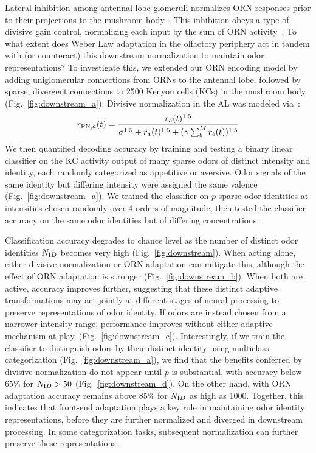 Lateral inhibition among antennal lobe glomeruli normalizes ORN responses prior to their projections to the mushroom body~\cite{lateral_inh, lateral_inh_asahina}. This inhibition obeys a type of divisive gain control, normalizing each input by the sum of ORN activity~\cite{divisive_normalization}. To what extent does Weber Law adaptation in the olfactory periphery act in tandem with (or counteract) this downstream normalization to maintain odor representations? To investigate this, we extended our ORN encoding model by adding uniglomerular connections from ORNs to the antennal lobe, followed by sparse, divergent connections to 2500 Kenyon cells (KCs) in the mushroom body~\cite{memory_review, litwinkumar, abbott_axel} (Fig.~\ref{fig:downstream_a}). Divisive normalization in the AL was modeled via~\cite{divisive_normalization}:
\begin{align}
r_{\textup{PN}, a}(t) = \frac{r_a(t)^{1.5}}{\sigma^{1.5} + r_a(t)^{1.5} + (\gamma\sum_b^Mr_b(t))^{1.5}}
\end{align}
We then quantified decoding accuracy by training and testing a binary linear classifier on the KC activity output of  many sparse odors of distinct intensity and identity,  each randomly categorized as appetitive or aversive. Odor signals of the same identity but differing intensity were assigned the same valence (Fig.~\ref{fig:downstream_a}). We trained the classifier on $p$ sparse odor identities at intensities chosen randomly over 4 orders of magnitude, then tested the classifier accuracy on the same odor identities but of differing concentrations. 

Classification accuracy degrades to chance level as the number of distinct odor identities $N_{\text ID}$ becomes very high (Fig.~\ref{fig:downstream}). When acting alone, either divisive normalization or ORN adaptation can mitigate this, although the effect of ORN adaptation is stronger (Fig.~\ref{fig:downstream_b}). When both are active, accuracy improves further, suggesting that these distinct adaptive transformations may act jointly at different stages of neural processing to preserve representations of odor identity.  If odors are instead chosen from a narrower intensity range, performance improves without either adaptive mechanism at play~(Fig.~\ref{fig:downstream_c}). Interestingly, if we train the classifier to distinguish odors by their distinct identity using multiclass categorization (Fig.~\ref{fig:downstream_a}), we find that the benefits conferred by divisive normalization do not appear until $p$ is substantial, with accuracy below $65\%$ for $N_{\text ID} > 50$ (Fig.~\ref{fig:downstream_d}). On the other hand, with ORN adaptation accuracy remains above $85\%$ for $N_{\text ID}$ as high as 1000. Together, this indicates that front-end adaptation plays a key role in maintaining odor identity representations, before they are further normalized and diverged in downstream processing. In some categorization tasks, subsequent normalization can further preserve these representations.

